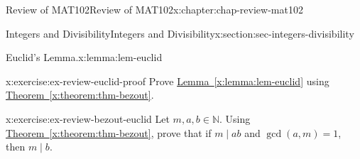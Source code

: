 \documentclass[oneside,10pt,]{book}
\newcommand{\xreffont}{\relax}
\numberwithin{equation}{section}
\begin{document}
\begin{chapterptx}{Review of MAT102}{}{Review of MAT102}{}{}{x:chapter:chap-review-mat102}
\begin{sectionptx}{Integers and Divisibility}{}{Integers and Divisibility}{}{}{x:section:sec-integers-divisibility}
\begin{lemma}{Euclid's Lemma.}{}{x:lemma:lem-euclid}
\end{lemma}
\begin{inlineexercise}{}{x:exercise:ex-review-euclid-proof}%
Prove \hyperref[x:lemma:lem-euclid]{Lemma~{\xreffont\ref{x:lemma:lem-euclid}}} using \hyperref[x:theorem:thm-bezout]{Theorem~{\xreffont\ref{x:theorem:thm-bezout}}}.%
\end{inlineexercise}
\begin{inlineexercise}{}{x:exercise:ex-review-bezout-euclid}%
Let \(m,a,b \in \mathbb{N}\). Using \hyperref[x:theorem:thm-bezout]{Theorem~{\xreffont\ref{x:theorem:thm-bezout}}}, prove that if \(m \mid ab\) and \(\gcd(a,m) = 1\), then \(m \mid b\).%
\end{inlineexercise}
\end{sectionptx}
\end{chapterptx}
%
%
\typeout{************************************************}
\typeout{************************************************}
%
\end{document}
